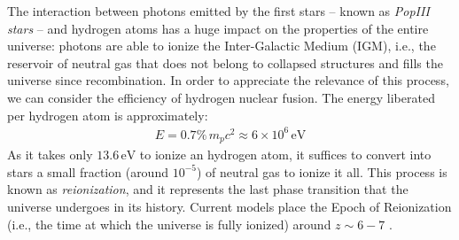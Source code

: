  The interaction between photons emitted by the first stars -- known as \textit{PopIII stars} -- and hydrogen atoms has a huge impact on the properties of the entire universe: photons are able to ionize the Inter-Galactic Medium (IGM), i.e., the reservoir of neutral gas that does not belong to collapsed structures and fills the universe since recombination.
 In order to appreciate the relevance of this process, we can consider the efficiency of hydrogen nuclear fusion. The energy liberated per hydrogen atom is approximately:
 \begin{align}
   E = 0.7\% \,m_p c^2 \approx 6\times 10^6\,\mathrm{eV}
 \end{align}
 As it takes only $13.6 \,\mathrm{eV}$ to ionize an hydrogen atom, it suffices to convert into stars a small fraction (around $10^{-5}$) of neutral gas to ionize it all. This process is known as \textit{reionization}, and it represents the last phase transition that the universe undergoes in its history. Current models place the Epoch of Reionization (i.e., the time at which the universe is fully ionized) around $z\sim6-7$ \citep{mesinger_2016}.
 
